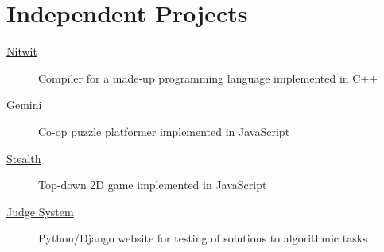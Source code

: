 \documentclass[letterpaper,11pt]{article}
\begin{document}
\section*{Independent Projects}
\begin{description}
    \item[\href{https://github.com/Alaxe/nitwit}{Nitwit}]
        Compiler for a made-up programming language implemented in C++
    \item[\href{https://github.com/Alaxe/gemini}{Gemini}]
        Co-op puzzle platformer implemented in JavaScript
    \item[\href{https://github.com/Alaxe/stealth}{Stealth}]
        Top-down 2D game implemented in JavaScript
    \item[\href{https://github.com/Alaxe/judgeSystem}{Judge System}]
        Python/Django website for testing of solutions to algorithmic tasks
\end{description}
\end{document}
